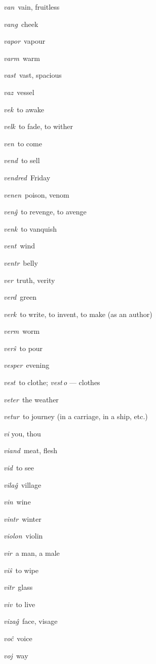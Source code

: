 \begin{landscape}
\begin{multicols}{5}
\begin{outdent}{1em}
\emph{van\,} vain, fruitless

\emph{vang\,} cheek

\emph{vapor\,} vapour

\emph{varm\,} warm

\emph{vast\,} vast, spacious

\emph{vaz\,} vessel

\emph{vek\,} to awake

\emph{velk\,} to fade, to wither

\emph{ven\,} to come

\emph{vend\,} to sell

\emph{vendred\,} Friday

\emph{venen\,} poison, venom

\emph{venĝ\,} to revenge, to avenge

\emph{venk\,} to vanquish

\emph{vent\,} wind

\emph{ventr\,} belly

\emph{ver\,} truth, verity

\emph{verd\,} green

\emph{verk\,} to write, to invent, to make (as an author)

\emph{verm\,} worm

\emph{verŝ\,} to pour

\emph{vesper\,} evening

\emph{vest\,} to clothe; \emph{vest\,o} — clothes

\emph{veter\,} the weather

\emph{vetur\,} to journey (in a carriage, in a ship, etc.)

\emph{vi} you, thou

\emph{viand\,} meat, flesh

\emph{vid\,} to see

\emph{vilaĝ\,} village

\emph{vin\,} wine

\emph{vintr\,} winter

\emph{violon\,} violin

\emph{vir\,} a man, a male

\emph{viŝ\,} to wipe

\emph{vitr\,} glass

\emph{viv\,} to live

\emph{vizaĝ\,} face, visage

\emph{voĉ\,} voice

\emph{voj\,} way


\end{outdent}
\end{multicols}
\end{landscape}
